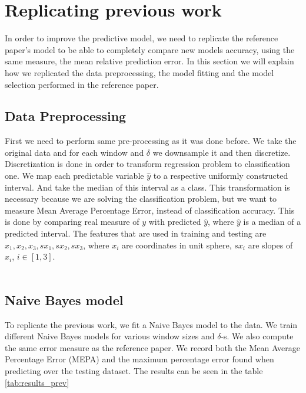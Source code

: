\documentclass[a4paper]{article}
\begin{document}
\section{Replicating previous work}

In order to improve the predictive model, we need to replicate the reference paper's model to be able to completely compare new models accuracy, using the same measure, the mean relative prediction error. In this section we will explain how we replicated the data preprocessing, the model fitting and the model selection performed in the reference paper.


\subsection{Data Preprocessing}

First we need to perform same pre-processing as it was done before. We take the original data and for each window and $\delta$ we downsample it and then discretize. Discretization is done in order to transform regression problem to classification one. We map each predictable variable $\hat{y}$ to a respective uniformly constructed interval. And take the median of this interval as a class. This transformation is necessary because we are solving the classification problem, but we want to measure Mean Average Percentage Error, instead of classification accuracy. This is done by comparing real measure of $y$ with predicted $\hat{y}$, where $\hat{y}$ is a median of a predicted interval. The features that are used in training and testing are $x_1,x_2,x_3,sx_1,sx_2,sx_3$, where $x_i$ are coordinates in unit sphere, $sx_i$ are slopes of $x_i$, $i \in [1,3]$.\\\\

\subsection{Naive Bayes model}

To replicate the previous work, we fit a Naive Bayes model to the data. We train different Naive Bayes models for various window sizes and $\delta$-s. We also compute the same error measure as the reference paper. We record both the Mean Average Percentage Error (MEPA) and the maximum percentage error found when predicting over the testing dataset. The results can be seen in the table \ref{tab:results_prev}
\end{document}
